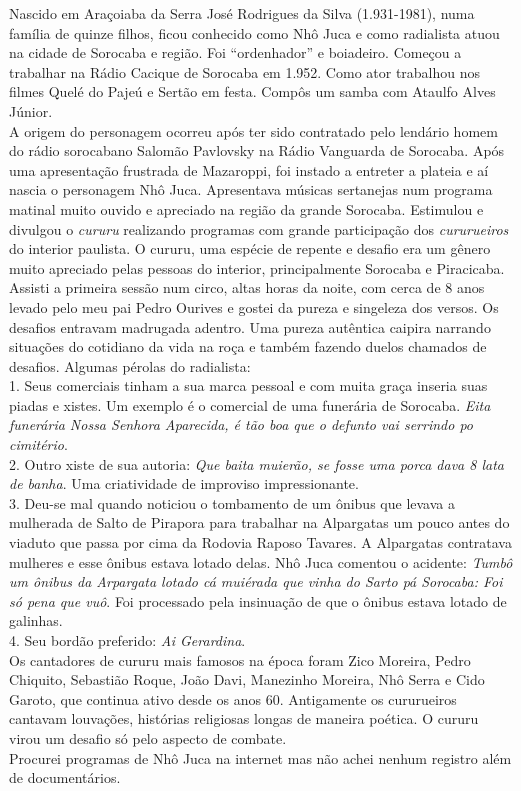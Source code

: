 \documentclass[12pt,brazil,]{book}
\begin{document}
Nascido em Araçoiaba da Serra José Rodrigues da Silva (1.931-1981), numa
família de quinze filhos, ficou conhecido como Nhô Juca e como
radialista atuou na cidade de Sorocaba e região. Foi ``ordenhador'' e
boiadeiro. Começou a trabalhar na Rádio Cacique de Sorocaba em 1.952.
Como ator trabalhou nos filmes Quelé do Pajeú e Sertão em festa. Compôs
um samba com Ataulfo Alves Júnior.\\
A origem do personagem ocorreu após ter sido contratado pelo lendário
homem do rádio sorocabano Salomão Pavlovsky na Rádio Vanguarda de
Sorocaba. Após uma apresentação frustrada de Mazaroppi, foi instado a
entreter a plateia e aí nascia o personagem Nhô Juca. Apresentava
músicas sertanejas num programa matinal muito ouvido e apreciado na
região da grande Sorocaba. Estimulou e divulgou o \emph{cururu}
realizando programas com grande participação dos \emph{cururueiros} do
interior paulista. O cururu, uma espécie de repente e desafio era um
gênero muito apreciado pelas pessoas do interior, principalmente
Sorocaba e Piracicaba.\\
Assisti a primeira sessão num circo, altas horas da noite, com cerca de
8 anos levado pelo meu pai Pedro Ourives e gostei da pureza e singeleza
dos versos. Os desafios entravam madrugada adentro. Uma pureza autêntica
caipira narrando situações do cotidiano da vida na roça e também fazendo
duelos chamados de desafios. Algumas pérolas do radialista:\\
1. Seus comerciais tinham a sua marca pessoal e com muita graça inseria
suas piadas e xistes. Um exemplo é o comercial de uma funerária de
Sorocaba. \emph{Eita funerária Nossa Senhora Aparecida, é tão boa que o
defunto vai serrindo po cimitério}.\\
2. Outro xiste de sua autoria: \emph{Que baita muierão, se fosse uma
porca dava 8 lata de banha}. Uma criatividade de improviso
impressionante.\\
3. Deu-se mal quando noticiou o tombamento de um ônibus que levava a
mulherada de Salto de Pirapora para trabalhar na Alpargatas um pouco
antes do viaduto que passa por cima da Rodovia Raposo Tavares. A
Alpargatas contratava mulheres e esse ônibus estava lotado delas. Nhô
Juca comentou o acidente: \emph{Tumbô um ônibus da Arpargata lotado cá
muiérada que vinha do Sarto pá Sorocaba: Foi só pena que vuô}. Foi
processado pela insinuação de que o ônibus estava lotado de galinhas.\\
4. Seu bordão preferido: \emph{Ai Gerardina}.\\
Os cantadores de cururu mais famosos na época foram Zico Moreira, Pedro
Chiquito, Sebastião Roque, João Davi, Manezinho Moreira, Nhô Serra e
Cido Garoto, que continua ativo desde os anos 60. Antigamente os
cururueiros cantavam louvações, histórias religiosas longas de maneira
poética. O cururu virou um desafio só pelo aspecto de combate.\\
Procurei programas de Nhô Juca na internet mas não achei nenhum registro
além de documentários.
\end{document}
